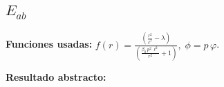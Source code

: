 \documentclass[11pt]{article}
\begin{document}
\subsection*{$ E_{ab} $}
\textbf{Funciones usadas:} $ f\!\left(r\right) = \frac{\left(\frac{{r}^{2}}{{\ell}^{2}} - \lambda\right)}{\left(\frac{\beta_{0}\,{p}^{2}\,{\ell}^{2}}{{r}^{2}} + 1\right)},\;\phi=p\,\varphi $.\par
\textbf{Resultado abstracto:}
\begin{dmath*}[breakdepth={5}]

\end{dmath*}
\end{document}
